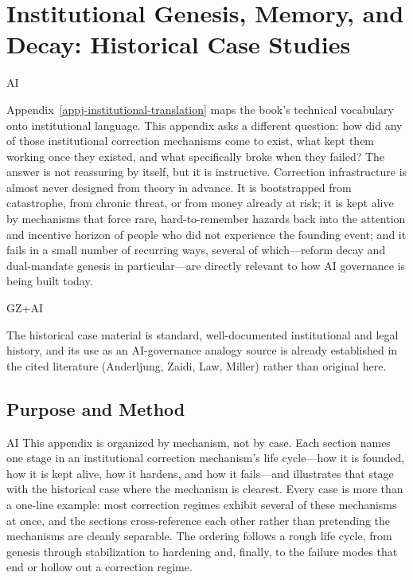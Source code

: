 \chapter{Institutional Genesis, Memory, and Decay: Historical Case Studies}
\label{appm-institutional-histories}

\begin{refsection}

\begin{authbar}{AI}
\begin{chapterthesis}
Appendix~\ref{appj-institutional-translation} maps the book's technical vocabulary onto institutional language.
This appendix asks a different question: how did any of those institutional correction mechanisms come to exist, what kept them working once they existed, and what specifically broke when they failed?
The answer is not reassuring by itself, but it is instructive.
Correction infrastructure is almost never designed from theory in advance.
It is bootstrapped from catastrophe, from chronic threat, or from money already at risk; it is kept alive by mechanisms that force rare, hard-to-remember hazards back into the attention and incentive horizon of people who did not experience the founding event; and it fails in a small number of recurring ways, several of which---reform decay and dual-mandate genesis in particular---are directly relevant to how AI governance is being built today.
\end{chapterthesis}
\end{authbar}

\begin{authbar}{GZ+AI}
\begin{epistemicstatus}
The historical case material is standard, well-documented institutional and legal history, and its use as an AI-governance analogy source is already established in the cited literature (Anderljung, Zaidi, Law, Miller) rather than original here.
\end{epistemicstatus}
\end{authbar}

\authbarneedspace
\section{Purpose and Method}
\label{sec:appm-purpose}
\begin{authbar}{AI}
This appendix is organized by mechanism, not by case.
Each section names one stage in an institutional correction mechanism's life cycle---how it is founded, how it is kept alive, how it hardens, and how it fails---and illustrates that stage with the historical case where the mechanism is clearest.
Every case is more than a one-line example: most correction regimes exhibit several of these mechanisms at once, and the sections cross-reference each other rather than pretending the mechanisms are cleanly separable.
The ordering follows a rough life cycle, from genesis through stabilization to hardening and, finally, to the failure modes that end or hollow out a correction regime.


\end{authbar}
\end{refsection}
